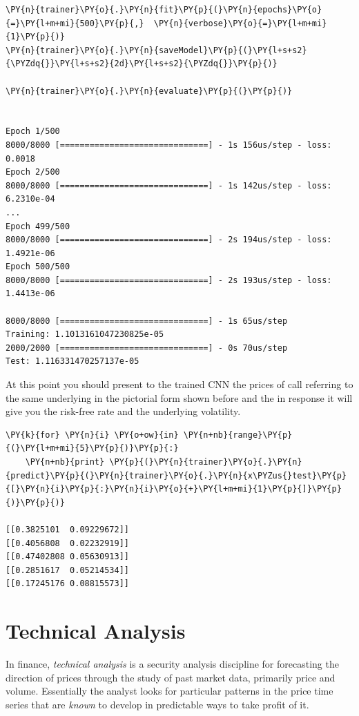 \begin{tcolorbox}[breakable, size=fbox, boxrule=1pt, pad at break*=1mm,colback=cellbackground, colframe=cellborder]
\begin{Verbatim}[commandchars=\\\{\}]
\PY{n}{trainer}\PY{o}{.}\PY{n}{fit}\PY{p}{(}\PY{n}{epochs}\PY{o}{=}\PY{l+m+mi}{500}\PY{p}{,}  \PY{n}{verbose}\PY{o}{=}\PY{l+m+mi}{1}\PY{p}{)}
\PY{n}{trainer}\PY{o}{.}\PY{n}{saveModel}\PY{p}{(}\PY{l+s+s2}{\PYZdq{}}\PY{l+s+s2}{2d}\PY{l+s+s2}{\PYZdq{}}\PY{p}{)}
	
\PY{n}{trainer}\PY{o}{.}\PY{n}{evaluate}\PY{p}{(}\PY{p}{)}


Epoch 1/500
8000/8000 [==============================] - 1s 156us/step - loss: 0.0018
Epoch 2/500
8000/8000 [==============================] - 1s 142us/step - loss: 6.2310e-04
...
Epoch 499/500
8000/8000 [==============================] - 2s 194us/step - loss: 1.4921e-06
Epoch 500/500
8000/8000 [==============================] - 2s 193us/step - loss: 1.4413e-06

8000/8000 [==============================] - 1s 65us/step
Training: 1.1013161047230825e-05
2000/2000 [==============================] - 0s 70us/step
Test: 1.116331470257137e-05
\end{Verbatim}
\end{tcolorbox}

At this point you should present to the trained CNN the prices of call
referring to the same underlying in the pictorial form shown before and
the in response it will give you the risk-free rate and the underlying
volatility.

\begin{tcolorbox}[breakable, size=fbox, boxrule=1pt, pad at break*=1mm,colback=cellbackground, colframe=cellborder]
\begin{Verbatim}[commandchars=\\\{\}]
\PY{k}{for} \PY{n}{i} \PY{o+ow}{in} \PY{n+nb}{range}\PY{p}{(}\PY{l+m+mi}{5}\PY{p}{)}\PY{p}{:}
    \PY{n+nb}{print} \PY{p}{(}\PY{n}{trainer}\PY{o}{.}\PY{n}{predict}\PY{p}{(}\PY{n}{trainer}\PY{o}{.}\PY{n}{x\PYZus{}test}\PY{p}{[}\PY{n}{i}\PY{p}{:}\PY{n}{i}\PY{o}{+}\PY{l+m+mi}{1}\PY{p}{]}\PY{p}{)}\PY{p}{)}

[[0.3825101  0.09229672]]
[[0.4056808  0.02232919]]
[[0.47402808 0.05630913]]
[[0.2851617  0.05214534]]
[[0.17245176 0.08815573]]
\end{Verbatim}
\end{tcolorbox}

\section{Technical Analysis}\label{technical-analysis}

In finance, \emph{technical analysis} is a security analysis discipline
for forecasting the direction of prices through the study of past market
data, primarily price and volume. Essentially the analyst looks for
particular patterns in the price time series that are \emph{known} to
develop in predictable ways to take profit of it.

